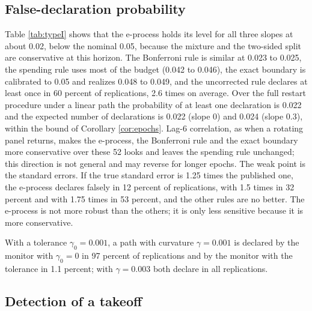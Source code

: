 \documentclass[Afour,sageh,times]{sagej}
\theoremstyle{definition}
\begin{document}
\subsection{False-declaration probability}
\label{sec:typeI}

\begin{table}[t]
\small\centering
\caption{Probability of at least one declaration over 52 looks (20,000 replications; nominal level 0.05). The first three rows are valid cases; correlated errors use a lag-6 autoregressive structure at the stated correlation, and standard errors are too small by the stated factor. Rows 4 to 10 use slope 0.15.}
\label{tab:typeI}

\end{table}

Table \ref{tab:typeI} shows that the e-process holds its level for all three slopes at about 0.02, below the nominal 0.05, because the mixture and the two-sided split are conservative at this horizon. The Bonferroni rule is similar at 0.023 to 0.025, the spending rule uses most of the budget (0.042 to 0.046), the exact boundary is calibrated to 0.05 and realizes 0.048 to 0.049, and the uncorrected rule declares at least once in 60 percent of replications, 2.6 times on average. Over the full restart procedure under a linear path the probability of at least one declaration is 0.022 and the expected number of declarations is 0.022 (slope 0) and 0.024 (slope 0.3), within the bound of Corollary \ref{cor:epochs}. Lag-6 correlation, as when a rotating panel returns, makes the e-process, the Bonferroni rule and the exact boundary more conservative over these 52 looks and leaves the spending rule unchanged; this direction is not general and may reverse for longer epochs. The weak point is the standard errors. If the true standard error is 1.25 times the published one, the e-process declares falsely in 12 percent of replications, with 1.5 times in 32 percent and with 1.75 times in 53 percent, and the other rules are no better. The e-process is not more robust than the others; it is only less sensitive because it is more conservative.

With a tolerance $\gamma_0 = 0.001$, a path with curvature $\gamma = 0.001$ is declared by the monitor with $\gamma_0 = 0$ in 97 percent of replications and by the monitor with the tolerance in 1.1 percent; with $\gamma = 0.003$ both declare in all replications.

\subsection{Detection of a takeoff}
\label{sec:power}
\end{document}
